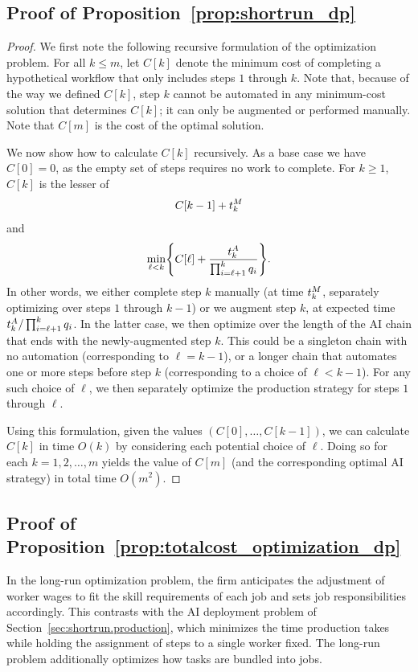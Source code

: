 \subsection{Proof of Proposition~\ref{prop:shortrun_dp}}
\label{app:shortrun_proof}

\begin{proof}
We first note the following recursive formulation of the optimization problem.
For all $k \leq m$, let $C[k]$ denote the minimum cost of completing a hypothetical workflow that only includes steps $1$ through $k$.
Note that, because of the way we defined $C[k]$, step $k$ cannot be automated in any minimum-cost solution that determines $C[k]$; it can only be augmented or performed manually.
Note that $C[m]$ is the cost of the optimal solution.

We now show how to calculate $C[k]$ recursively.
As a base case we have $C[0] = 0$, as the empty set of steps requires no work to complete.
For $k \geq 1$, $C[k]$ is the lesser of
\[ C[k-1] + t^{M}_{k} \]
and
\[ \min_{\ell < k} \Biggl\{ C[\ell] + \frac{t^{A}_{k}}{\prod_{i=\ell+1}^k q_i} \Biggr\}.
\]
In other words, we either complete step $k$ manually (at time $t^{M}_{k}$, separately optimizing over steps $1$ through $k-1$) or we augment step $k$, at expected time $t^{A}_{k}/\prod_{i=\ell+1}^k q_i$.
In the latter case, we then optimize over the length of the AI chain that ends with the newly-augmented step $k$.
This could be a singleton chain with no automation (corresponding to $\ell = k-1$), or a longer chain that automates one or more steps before step $k$ (corresponding to a choice of $\ell < k-1$).
For any such choice of $\ell$, we then separately optimize the production strategy for steps $1$ through $\ell$.

Using this formulation, given the values $(C[0], \dotsc, C[k-1])$, we can calculate $C[k]$ in time $O(k)$ by considering each potential choice of $\ell$.
Doing so for each $k = 1, 2, \dotsc, m$ yields the value of $C[m]$ (and the corresponding optimal AI strategy) in total time $O(m^2)$.
\end{proof}

\subsection{Proof of Proposition~\ref{prop:totalcost_optimization_dp}}
\label{app:jobdesign.longrun}

In the long-run optimization problem, the firm anticipates the adjustment of worker wages to fit the skill requirements of each job and sets job responsibilities accordingly.
This contrasts with the AI deployment problem of Section~\ref{sec:shortrun.production}, which minimizes the time production takes while holding the assignment of steps to a single worker fixed. 
The long-run problem additionally optimizes how tasks are bundled into jobs.

